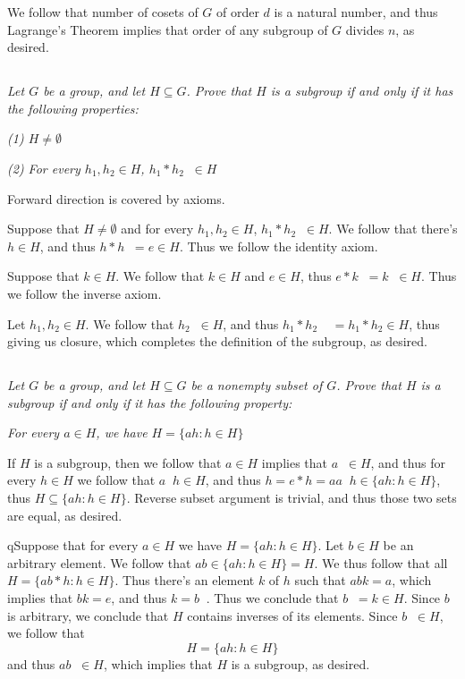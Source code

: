 \documentclass[11pt,oneside,titlepage]{book}
\DeclareMathOperator \inv {^{-1}}
\newcommand{\set}[1]{\{ #1 \}}
\begin{document}
We follow that number of cosets of $G$ of order $d$ is a natural number, and thus
Lagrange's Theorem implies that order of any subgroup of $G$ divides $n$, as desired.

\subsection{}

\textit{Let $G$ be a group, and let $H \subseteq G$. Prove that $H$ is a subgroup
  if and only if it has the following properties:}

\textit{(1) $H \neq \emptyset$}

\textit{(2) For every $h_1, h_2 \in H$, $h_1 * h_2 \inv \in H$}

Forward direction is covered by axioms.

Suppose that $H \neq \emptyset$ and for every $h_1, h_2 \in H$, $h_1 *
h_2 \inv \in H$. We follow that there's $h \in H$, and thus
$h * h\inv = e \in H$. Thus we follow the identity axiom.

Suppose that $k \in H$. We follow that $k \in H$ and $e \in H$, thus
$e * k\inv = k\inv \in H$. Thus we follow the inverse axiom.

Let $h_1, h_2 \in H$. We follow that $h_2 \inv \in H$, and thus
$h_1 * h_2 \inv \inv = h_1 * h_2 \in H$, thus giving us closure,
which completes the definition of the subgroup, as desired.

\subsection{}

\textit{Let $G$ be a group, and let $H \subseteq G$ be a nonempty subset of $G$. Prove that
  $H$ is a subgroup if and only if it has the following property:}

\textit{For every $a \in H$, we have $H = \set{ah: h \in H}$}

If $H$ is a subgroup, then we follow that $a \in H$ implies that
$a\inv \in H$, and thus for every $h \in H$ we follow that $a \inv h
\in H$, and thus $h = e * h = a a\inv h \in \set{ah: h \in H}$, thus
$H \subseteq \set{ah: h \in H}$. Reverse subset argument is trivial, and thus
those two sets are equal, as desired.

qSuppose that for every $a \in H$ we have $H = \set{ah: h \in H}$.
Let $b \in H$ be an arbitrary element. We follow that $a b \in
\set{ah: h \in H} = H$.  We thus follow that all $H = \set{ab * h: h
\in H}$. Thus there's an element $k$ of $h$ such that $abk = a$, which
implies that $bk = e$, and thus $k = b\inv$. Thus we conclude that
$b\inv = k \in H$. Since $b$ is arbitrary, we conclude that $H$
contains inverses of its elements. Since $b\inv \in H$, we follow that
$$H = \set{a h: h \in H}$$
and thus $a b\inv \in H$, which implies that $H$ is a subgroup, as desired.
\end{document}
